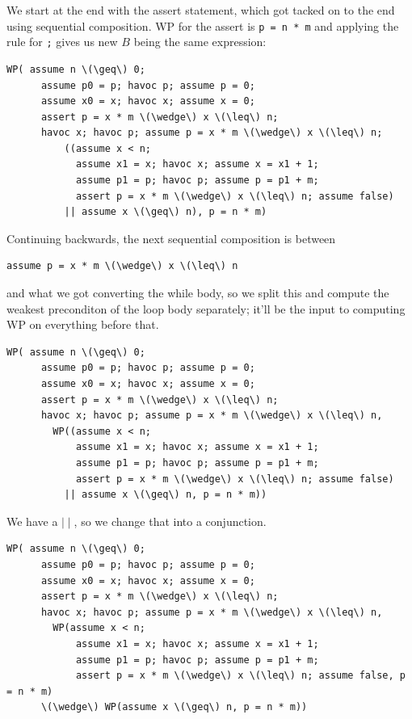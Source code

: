 We start at the end with the \textsf{assert} statement, which got tacked on to the end using sequential composition. WP for the assert is \texttt{p = n * m} and
applying the rule for \verb+;+ gives us new $B$ being the same expression:
\begin{Verbatim}[commandchars=\\\{\}]
  WP( assume n \(\geq\) 0;
      assume p0 = p; havoc p; assume p = 0; 
      assume x0 = x; havoc x; assume x = 0; 
      assert p = x * m \(\wedge\) x \(\leq\) n;
      havoc x; havoc p; assume p = x * m \(\wedge\) x \(\leq\) n;
          ((assume x < n; 
            assume x1 = x; havoc x; assume x = x1 + 1; 
            assume p1 = p; havoc p; assume p = p1 + m; 
            assert p = x * m \(\wedge\) x \(\leq\) n; assume false) 
          || assume x \(\geq\) n), p = n * m)
\end{Verbatim}
Continuing backwards, the next sequential composition is between
\begin{Verbatim}[commandchars=\\\{\}]
  assume p = x * m \(\wedge\) x \(\leq\) n
\end{Verbatim}
and what we got converting the \textsf{while} body, so we split this and
compute the weakest preconditon of the loop body separately; it'll be the input to computing
WP on everything before that.
\begin{Verbatim}[commandchars=\\\{\}]
  WP( assume n \(\geq\) 0;
      assume p0 = p; havoc p; assume p = 0; 
      assume x0 = x; havoc x; assume x = 0; 
      assert p = x * m \(\wedge\) x \(\leq\) n;
      havoc x; havoc p; assume p = x * m \(\wedge\) x \(\leq\) n,
        WP((assume x < n; 
            assume x1 = x; havoc x; assume x = x1 + 1; 
            assume p1 = p; havoc p; assume p = p1 + m; 
            assert p = x * m \(\wedge\) x \(\leq\) n; assume false) 
          || assume x \(\geq\) n, p = n * m))
\end{Verbatim}
We have a $\mid\mid$, so we change that into a conjunction.
\begin{Verbatim}[commandchars=\\\{\}]
  WP( assume n \(\geq\) 0;
      assume p0 = p; havoc p; assume p = 0; 
      assume x0 = x; havoc x; assume x = 0; 
      assert p = x * m \(\wedge\) x \(\leq\) n;
      havoc x; havoc p; assume p = x * m \(\wedge\) x \(\leq\) n,
        WP(assume x < n; 
            assume x1 = x; havoc x; assume x = x1 + 1; 
            assume p1 = p; havoc p; assume p = p1 + m; 
            assert p = x * m \(\wedge\) x \(\leq\) n; assume false, p = n * m)
      \(\wedge\) WP(assume x \(\geq\) n, p = n * m))
\end{Verbatim}
